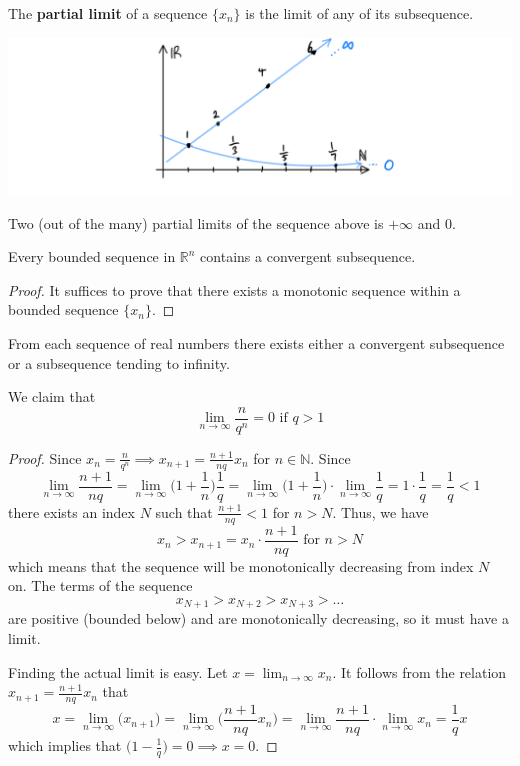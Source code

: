 \documentclass{article}
\begin{document}
    \begin{definition}
      The \textbf{partial limit} of a sequence $\{x_n\}$ is the limit of any of its subsequence.  
      \begin{center}
          \includegraphics[scale=0.26]{img/Partial_Limit.PNG}
      \end{center}
      Two (out of the many) partial limits of the sequence above is $+\infty$ and $0$. 
    \end{definition}

    \begin{theorem}
      Every bounded sequence in $\mathbb{R}^n$ contains a convergent subsequence. 
    \end{theorem} 
    \begin{proof}
      It suffices to prove that there exists a monotonic sequence within a bounded sequence $\{x_n\}$. 
    \end{proof}

    \begin{corollary}
      From each sequence of real numbers there exists either a convergent subsequence or a subsequence tending to infinity. 
    \end{corollary}

    \begin{example}
      We claim that 
      \[\lim_{n\rightarrow \infty} \frac{n}{q^n} = 0 \text{ if } q>1\]
    \end{example}
    \begin{proof}
      Since $x_n = \frac{n}{q^n} \implies x_{n+1} = \frac{n+1}{nq} x_n$ for $n \in \mathbb{N}$. Since 
      \[\lim_{n\rightarrow \infty} \frac{n+1}{nq} = \lim_{n \rightarrow \infty} \bigg(1 + \frac{1}{n}\bigg) \frac{1}{q} = \lim_{n\rightarrow \infty} \bigg( 1 + \frac{1}{n} \bigg) \cdot \lim_{n\rightarrow \infty} \frac{1}{q} = 1 \cdot \frac{1}{q} = \frac{1}{q} < 1\]
      there exists an index $N$ such that $\frac{n+1}{nq} < 1$ for $n>N$. Thus, we have 
      \[x_n > x_{n+1} = x_n \cdot \frac{n+1}{nq} \text{ for } n > N\]
      which means that the sequence will be monotonically decreasing from index $N$ on. The terms of the sequence
      \[x_{N+1} > x_{N+2} > x_{N+3} > \ldots\]
      are positive (bounded below) and are monotonically decreasing, so it must have a limit. 

      Finding the actual limit is easy. Let $x = \lim_{n \rightarrow \infty} x_n$. It follows from the relation $x_{n+1} = \frac{n+1}{nq} x_n$ that
      \[x = \lim_{n\rightarrow \infty} \big(x_{n+1}\big) = \lim_{n \rightarrow \infty} \bigg(\frac{n+1}{nq} x_n \bigg) = \lim_{n \rightarrow \infty} \frac{n+1}{nq} \cdot \lim_{n \rightarrow \infty} x_n = \frac{1}{q} x\]
      which implies that $\big( 1 - \frac{1}{q}\big) = 0 \implies x = 0$.
    \end{proof}
\end{document}
